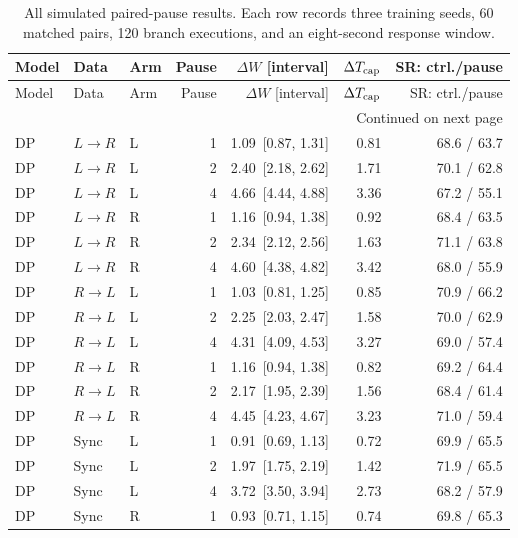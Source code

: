 {\small
\begin{longtable}{lllrrrr}
\caption{All simulated paired-pause results. Each row records three training seeds, 60 matched pairs, 120 branch executions, and an eight-second response window.}\label{tab:freezefull}\\
\toprule
Model & Data & Arm & Pause & $\Delta W$ [interval] & $\Delta T_{\rm cap}$ & SR: ctrl./pause \\
\midrule
\endfirsthead
\toprule
Model & Data & Arm & Pause & $\Delta W$ [interval] & $\Delta T_{\rm cap}$ & SR: ctrl./pause \\
\midrule
\endhead
\midrule\multicolumn{7}{r}{Continued on next page}\\
\endfoot
\bottomrule
\endlastfoot
DP & $L\!\rightarrow\!R$ & L & 1 & 1.09\, [0.87, 1.31] & 0.81 & 68.6 / 63.7 \\
DP & $L\!\rightarrow\!R$ & L & 2 & 2.40\, [2.18, 2.62] & 1.71 & 70.1 / 62.8 \\
DP & $L\!\rightarrow\!R$ & L & 4 & 4.66\, [4.44, 4.88] & 3.36 & 67.2 / 55.1 \\
DP & $L\!\rightarrow\!R$ & R & 1 & 1.16\, [0.94, 1.38] & 0.92 & 68.4 / 63.5 \\
DP & $L\!\rightarrow\!R$ & R & 2 & 2.34\, [2.12, 2.56] & 1.63 & 71.1 / 63.8 \\
DP & $L\!\rightarrow\!R$ & R & 4 & 4.60\, [4.38, 4.82] & 3.42 & 68.0 / 55.9 \\
\midrule
DP & $R\!\rightarrow\!L$ & L & 1 & 1.03\, [0.81, 1.25] & 0.85 & 70.9 / 66.2 \\
DP & $R\!\rightarrow\!L$ & L & 2 & 2.25\, [2.03, 2.47] & 1.58 & 70.0 / 62.9 \\
DP & $R\!\rightarrow\!L$ & L & 4 & 4.31\, [4.09, 4.53] & 3.27 & 69.0 / 57.4 \\
DP & $R\!\rightarrow\!L$ & R & 1 & 1.16\, [0.94, 1.38] & 0.82 & 69.2 / 64.4 \\
DP & $R\!\rightarrow\!L$ & R & 2 & 2.17\, [1.95, 2.39] & 1.56 & 68.4 / 61.4 \\
DP & $R\!\rightarrow\!L$ & R & 4 & 4.45\, [4.23, 4.67] & 3.23 & 71.0 / 59.4 \\
\midrule
DP & Sync & L & 1 & 0.91\, [0.69, 1.13] & 0.72 & 69.9 / 65.5 \\
DP & Sync & L & 2 & 1.97\, [1.75, 2.19] & 1.42 & 71.9 / 65.5 \\
DP & Sync & L & 4 & 3.72\, [3.50, 3.94] & 2.73 & 68.2 / 57.9 \\
DP & Sync & R & 1 & 0.93\, [0.71, 1.15] & 0.74 & 69.8 / 65.3 \\

\end{longtable}}
